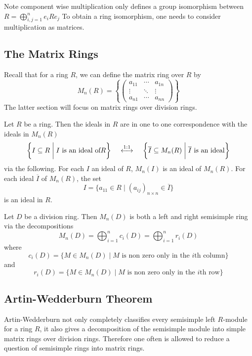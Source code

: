 \documentclass[a4paper]{article}
\begin{document}
Note component wise multiplication only defines a group isomorphism between $R=\bigoplus_{i,j=1}^ne_iRe_j$ To obtain a ring isomorphism, one needs to consider multiplication as matrices. 

\subsection{The Matrix Rings}
Recall that for a ring $R$, we can define the matrix ring over $R$ by $$M_n(R)=\left\{\begin{pmatrix}
a_{11} & \cdots & a_{1n}\\
\vdots & \ddots & \vdots\\
a_{n1} & \cdots & a_{nn}
\end{pmatrix}\right\}$$ The latter section will focus on matrix rings over division rings. 

\begin{prp}{}{} Let $R$ be a ring. Then the ideals in $R$ are in one to one correspondence with the ideals in $M_n(R)$ $$\left\{I\subseteq R\;\bigg{|}\;I\text{ is an ideal of} R\right\}\;\;\;\;\overset{1:1}{\longleftrightarrow}\;\;\;\;\left\{\overline{I}\subseteq M_n(R)\;\bigg{|}\;\overline{I}\text{ is an ideal}\right\}$$ via the following. For each $I$ an ideal of $R$, $M_n(I)$ is an ideal of $M_n(R)$. For each ideal $\overline{I}$ of $M_n(R)$, the set $$I=\{a_{11}\in R\;|\;(a_{ij})_{n\times  n}\in\overline{I}\}$$ is an ideal in $R$. 
\end{prp}

\begin{prp}{}{} Let $D$ be a division ring. Then $M_n(D)$ is both a left and right semisimple ring via the decompositions $$M_n(D)=\bigoplus_{i=1}^nc_i(D)=\bigoplus_{i=1}^nr_i(D)$$ where $$c_i(D)=\{M\in M_n(D)\;|\;M\text{ is non zero only in the }i\text{th column}\}$$ and $$r_i(D)=\{M\in M_n(D)\;|\;M\text{ is non zero only in the }i\text{th row}\}$$
\end{prp}

\subsection{Artin-Wedderburn Theorem}
Artin-Wedderburn not only completely classifies every semisimple left $R$-module for a ring $R$, it also gives a decomposition of the semisimple module into simple matrix rings over division rings. Therefore one often is allowed to reduce a question of semisimple rings into matrix rings. 
\end{document}
